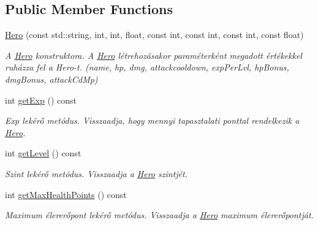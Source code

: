 \subsection*{Public Member Functions}
\begin{DoxyCompactItemize}
\item 
\mbox{\label{classHero_a2b2487de5bea68a17d535e8155c0d99a}} 
\hyperlink{classHero_a2b2487de5bea68a17d535e8155c0d99a}{Hero} (const std\+::string, int, int, float, const int, const int, const int, const float)
\begin{DoxyCompactList}\small\item\em A \hyperlink{classHero}{Hero} konstruktora. A \hyperlink{classHero}{Hero} létrehozásakor paraméterként megadott értékekkel ruházza fel a Hero-\/t. (name, hp, dmg, attackcooldown, exp\+Per\+Lvl, hp\+Bonus, dmg\+Bonus, attack\+Cd\+Mp) \end{DoxyCompactList}\item 
\mbox{\label{classHero_aca45aa10e1caefaf84a22ed42fd4f7df}} 
int \hyperlink{classHero_aca45aa10e1caefaf84a22ed42fd4f7df}{get\+Exp} () const
\begin{DoxyCompactList}\small\item\em Exp lekérő metódus. Visszaadja, hogy mennyi tapasztalati ponttal rendelkezik a \hyperlink{classHero}{Hero}. \end{DoxyCompactList}\item 
\mbox{\label{classHero_a17e77f3769e62aeb4e1807bbfc720f47}} 
int \hyperlink{classHero_a17e77f3769e62aeb4e1807bbfc720f47}{get\+Level} () const
\begin{DoxyCompactList}\small\item\em Szint lekérő metódus. Visszaadja a \hyperlink{classHero}{Hero} szintjét. \end{DoxyCompactList}\item 
\mbox{\label{classHero_ac6a7deeb6e390a23536d622042f4c48e}} 
int \hyperlink{classHero_ac6a7deeb6e390a23536d622042f4c48e}{get\+Max\+Health\+Points} () const
\begin{DoxyCompactList}\small\item\em Maximum élererőpont lekérő metódus. Visszaadja a \hyperlink{classHero}{Hero} maximum élererőpontját. \end{DoxyCompactList}\item 

\end{DoxyCompactItemize}
